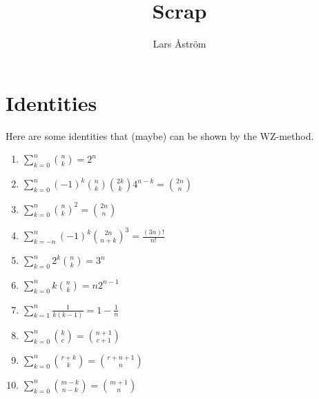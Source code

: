 \documentclass[a4paper, 12pt]{article}
\title{Scrap}
\author{Lars Åström}
\date{} %
\let\stdsection\section
\renewcommand\section{\newpage\stdsection}
\theoremstyle{definition}
\begin{document}
\maketitle
\section{Identities}
Here are some identities that (maybe) can be shown by the WZ-method.
\begin{enumerate}
  \item $\sum_{k=0}^n \binom{n}{k} = 2^n$
  \item $\sum_{k=0}^n (-1)^k\binom{n}{k}\binom{2k}{k}4^{n-k}=\binom{2n}{n}$
  \item $\sum_{k=0}^n \binom{n}{k}^2 = \binom{2n}{n}$
  \item $\sum_{k=-n}^n (-1)^k\binom{2n}{n+k}^3 = \frac{(3n)!}{n!}$
  \item $\sum_{k=0}^n 2^k\binom{n}{k} = 3^n$
  \item $\sum_{k=0}^n k\binom{n}{k} = n2^{n-1}$
  \item $\sum_{k=1}^n \frac{1}{k(k-1)} = 1-\frac{1}{n}$
  \item $\sum_{k=0}^n \binom{k}{c} = \binom{n+1}{c+1}$
  \item $\sum_{k=0}^n \binom{r+k}{k} = \binom{r+n+1}{n}$
  \item $\sum_{k=0}^n \binom{m-k}{n-k} = \binom{m+1}{n}$
\end{enumerate}
\end{document}
